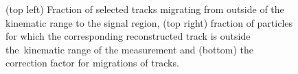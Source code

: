 \begin{figure}[h!]
\begin{subfigure}{.45\textwidth}
	\end{subfigure}
	\begin{minipage}{.45\textwidth}
		\caption{(top left) Fraction of selected tracks migrating from outside of the kinematic range to the signal region, (top right) fraction of particles for which the corresponding reconstructed track is outside the~kinematic range of the measurement and (bottom) the correction factor for migrations of tracks.}
		\label{fig:okr}
	\end{minipage}
	
\end{figure}



\FloatBarrier